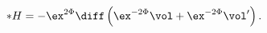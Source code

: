 \begin{equation}
\label{susuH}
   *H = -\ex^{2\Phi}\diff \left(\ex^{-2\Phi}\vol+\ex^{-2\Phi}\vol'\right) .
\end{equation}

